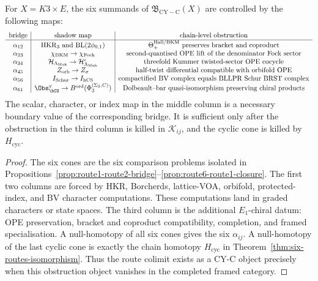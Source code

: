 \begin{proposition}
\label{prop:cy-c-six-bridge-obstruction-complex}
For \(X=K3\times E\), the six summands of
\(\mathfrak B_{\mathrm{CY-C}}(X)\) are controlled by the following
maps:
\[
\begin{array}{c|c|c}
\text{bridge} & \text{shadow map} & \text{chain-level obstruction}\\
\hline
\alpha_{12} &
\mathrm{HKR}_3\ \text{and}\ \mathrm{BL}(2\phi_{0,1}) &
\Theta_{+}^{\mathrm{Hall/BKM}}\ \text{preserves bracket and coproduct}\\
\alpha_{23} &
\chi_{\mathrm{BKM}}\to \chi_{\mathrm{Fock}} &
\text{second-quantised OPE lift of the denominator Fock sector}\\
\alpha_{34} &
\mathcal H_{\Lambda_{\mathrm{Muk}}}\to \mathcal H_{\Lambda_{\mathrm{Muk}}}^{\iota} &
\text{threefold Kummer twisted-sector OPE cocycle}\\
\alpha_{45} &
Z_{\mathrm{orb}}\to Z_{\sigma} &
\text{half-twist differential compatible with orbifold OPE}\\
\alpha_{56} &
I_{\mathrm{Schur}}\to I_{\mathrm{hCS}} &
\text{compactified BV complex equals BLLPR Schur BRST complex}\\
\alpha_{61} &
\Obs_{\hCS}^q\to B^{\mathrm{ord}}(\Phi_3^{(\Sigma_2,C)}) &
\text{Dolbeault--bar quasi-isomorphism preserving chiral products}
\end{array}
\]
The scalar, character, or index map in the middle column is a necessary
boundary value of the corresponding bridge. It is sufficient only after
the obstruction in the third column is killed in
\(\mathcal K_{ij}\), and the cyclic cone is killed by
\(H_{\mathrm{cyc}}\).
\end{proposition}

\begin{proof}
The six cones are the six comparison problems isolated in
Propositions~\ref{prop:route1-route2-bridge}--\ref{prop:route6-route1-closure}.
The first two columns are forced by HKR, Borcherds, lattice-VOA,
orbifold, protected-index, and BV character computations. These
computations land in graded characters or state spaces. The third
column is the additional \(E_1\)-chiral datum: OPE preservation,
bracket and coproduct compatibility, completion, and framed
specialisation. A null-homotopy of all six cones gives the six
\(\alpha_{ij}\). A null-homotopy of the last cyclic cone is exactly
the chain homotopy \(H_{\mathrm{cyc}}\) in
Theorem~\ref{thm:six-routes-isomorphism}. Thus the route colimit exists
as a CY-C object precisely when this obstruction object vanishes in the
completed framed category.
\end{proof}

